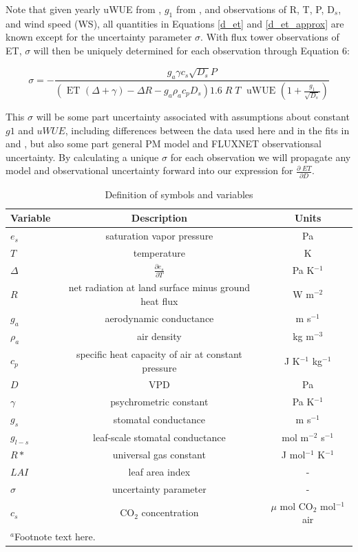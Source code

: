 \documentclass[draft,linenumbers]{agujournal}
\begin{document}
Note that given yearly uWUE from \citet{Zhou_2015}, $g_1$ from \citet{Lin_2015} \citep[as presented in ][]{Franks_2017}, and observations of R, T, P, D$_s$, and wind speed (WS), all quantities in Equations \ref{d_et} and \ref{d_et_approx} are known except for the uncertainty parameter $\sigma$. With flux tower observations of ET, $\sigma$ will then be uniquely determined for each observation through Equation 6:

\begin{linenomath*}
  \begin{equation}
    \sigma = -\frac{g_a \gamma c_s \sqrt{D_s} P }{ \left(\text{ ET } ( \Delta + \gamma) - \Delta R - g_a \rho_a c_p D_{s}\right) 1.6 \; R\; T\; \text{ uWUE } (1 + \frac{g_1}{\sqrt{D_s}})}
    \label{lai}
  \end{equation}
\end{linenomath*}

This $\sigma$ will be some part uncertainty associated with assumptions about constant $g1$ and $uWUE$, including differences between the data used here and in the fits in \citet{Zhou_2015} and \citet{Lin_2015}, but also some part general PM model and FLUXNET observationsal uncertainty. By calculating a unique $\sigma$ for each observation we will propagate any model and observational uncertainty forward into our expression for $\frac{\partial \; ET}{\partial D}$. 


\begin{table}
\caption{Definition of symbols and variables}
\centering
\begin{tabular}{l c c}
\hline
 Variable & Description & Units  \\
\hline
$e_s$  & saturation vapor pressure & Pa  \\ 
$T$  & temperature  & K \\
$\Delta$  & $\frac{\partial e_s}{\partial T}$ & Pa K$^{-1}$ \\
$R$  & net radiation at land surface minus ground heat flux & W m$^{-2}$   \\
  $g_a$  & aerodynamic conductance & m s$^{-1}$  \\
  $\rho_a$  & air density & kg m$^{-3}$  \\
  $c_p$  & specific heat capacity of air at constant pressure & J K$^{-1}$ kg$^{-1}$ \\
  $D$  & VPD & Pa  \\
  $\gamma$  & psychrometric constant & Pa K$^{-1}$   \\
  $g_s$  & stomatal conductance & m s$^{-1}$  \\
  $g_{l-s}$  & leaf-scale stomatal conductance & mol m$^{-2}$ s$^{-1}$  \\
  $R*$ & universal gas constant & J mol$^{-1}$ K$^{-1}$ \\
  $LAI$ & leaf area index & -\\
  $\sigma$ & uncertainty parameter & -\\
  $c_s$ & CO$_2$ concentration & $\mu$ mol CO$_2$ mol$^{-1}$ air\\
\hline
\multicolumn{2}{l}{$^{a}$Footnote text here.}
\end{tabular}
\end{table}
\end{document}
